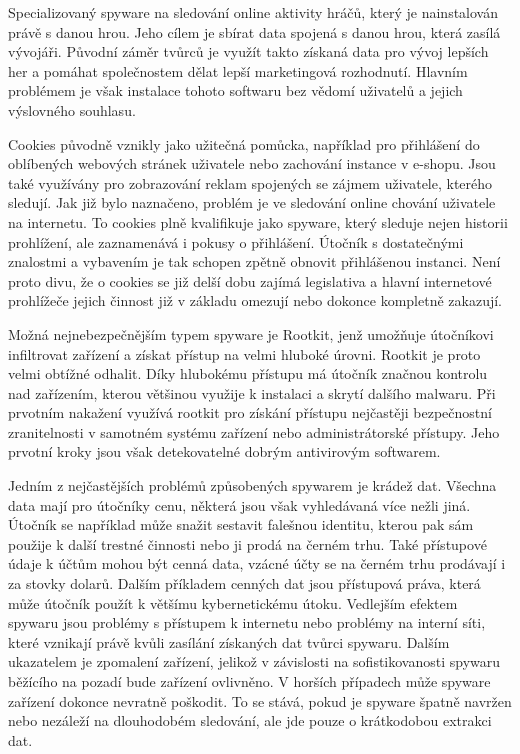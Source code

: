 Specializovaný spyware na sledování online aktivity hráčů, který je nainstalován právě s danou hrou.
Jeho cílem je sbírat data spojená s danou hrou, která zasílá vývojáři.
Původní záměr tvůrců je využít takto získaná data pro vývoj lepších her a pomáhat společnostem dělat lepší marketingová rozhodnutí.
Hlavním problémem je však instalace tohoto softwaru bez vědomí uživatelů a jejich výslovného souhlasu.\cite{avast_spyware}

Cookies původně vznikly jako užitečná pomůcka, například pro přihlášení do oblíbených webových stránek uživatele nebo zachování instance v e-shopu.
Jsou také využívány pro zobrazování reklam spojených se zájmem uživatele, kterého sledují.
Jak již bylo naznačeno, problém je ve sledování online chování uživatele na internetu.
To cookies plně kvalifikuje jako spyware, který sleduje nejen historii prohlížení, ale zaznamenává i pokusy o přihlášení.
Útočník s dostatečnými znalostmi a vybavením je tak schopen zpětně obnovit přihlášenou instanci.
Není proto divu, že o cookies se již delší dobu zajímá legislativa a hlavní internetové prohlížeče jejich činnost již v základu omezují nebo dokonce kompletně zakazují.\cite{avast_spyware}

Možná nejnebezpečnějším typem spyware je Rootkit, jenž umožňuje útočníkovi infiltrovat zařízení a získat přístup na velmi hluboké úrovni.
Rootkit je proto velmi obtížné odhalit.
Díky hlubokému přístupu má útočník značnou kontrolu nad zařízením, kterou většinou využije k instalaci a skrytí dalšího malwaru.
Při prvotním nakažení využívá rootkit pro získání přístupu nejčastěji bezpečnostní zranitelnosti v samotném systému zařízení nebo administrátorské přístupy.
Jeho prvotní kroky jsou však detekovatelné dobrým antivirovým softwarem.\cite{avast_spyware}

Jedním z nejčastějších problémů způsobených spywarem je krádež dat.
Všechna data mají pro útočníky cenu, některá jsou však vyhledávaná více nežli jiná.
Útočník se například může snažit sestavit falešnou identitu, kterou pak sám použije k další trestné činnosti nebo ji prodá na černém trhu.
Také přístupové údaje k účtům mohou být cenná data, vzácné účty se na černém trhu prodávají i za stovky dolarů.
Dalším příkladem cenných dat jsou přístupová práva, která může útočník použít k většímu kybernetickému útoku.
Vedlejším efektem spywaru jsou problémy s přístupem k internetu nebo problémy na interní síti, které vznikají právě kvůli zasílání získaných dat tvůrci spywaru.
Dalším ukazatelem je zpomalení zařízení, jelikož v závislosti na sofistikovanosti spywaru běžícího na pozadí bude zařízení ovlivněno.
V horších případech může spyware zařízení dokonce nevratně poškodit.
To se stává, pokud je spyware špatně navržen nebo nezáleží na dlouhodobém sledování, ale jde pouze o krátkodobou extrakci dat.\cite{avast_spyware, fortinet_spyware}


